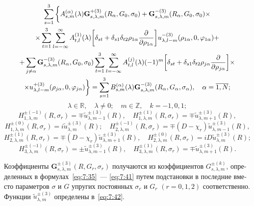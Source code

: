 \begin{russian}
\begin{multline}
\sum\limits_{s = 1}^3 \bigg\{  A_{s,m}^{(\alpha )}(\lambda ){\bf{G}}_{s,\lambda ,m}^{ + (3)}({R_\alpha },{G_0},{\sigma _0}) + {\bf{G}}_{s,\lambda ,m}^{ - (3)}({R_\alpha },{G_0},{\sigma _0}) \times \\
\times \sum\limits_{t = 1}^3 {\sum\limits_{l =  - \infty }^\infty  {A_{t,l}^{(1)}} } (\lambda )\bigg[{\delta _{st}} + {\delta _{s1}}{\delta _{t2}}{\rho _{1\alpha }}\frac{\partial }{{\partial {\rho _{1\alpha }}}}\bigg]u_{\lambda ,l - m}^{ - (3)}({\rho _{1\alpha }},0,{\varphi _{1\alpha }}) + \\
+ \sum\limits_{j \ne \alpha } {{\bf{G}}_{s,\lambda ,m}^{ - (3)}} ({R_\alpha },{G_0},{\sigma _0})\sum\limits_{t = 1}^3 {\sum\limits_{l =  - \infty }^\infty  {A_{t,l}^{(j)}} } (\lambda ){( - 1)^m}\bigg[{\delta _{st}} + {\delta _{s1}}{\delta _{t2}}{\rho _{j\alpha }}\frac{\partial }{{\partial {\rho _{j\alpha }}}}\bigg] \times \\
\times u_{\lambda ,l - m}^{ + (3)}({\rho _{j\alpha }},0,{\varphi _{j\alpha }})\bigg\}  = \sum\limits_{s = 1}^3 {B_{s,m}^{(\alpha )}} (\lambda ){\bf{G}}_{s,\lambda ,m}^{ - (3)}({R_\alpha },{G_\alpha },{\sigma _\alpha }),\;\;\;{\mkern 1mu} {\kern 1pt} \alpha  = \overline {1,N}; 
\end{multline}
$$
\lambda\in\mathbb{R},\quad\lambda\neq 0;\quad m\in\mathbb{Z},\quad k=-1,0,1;
$$
$$
H_{1,\lambda ,m}^{ \pm ( - 1)}(R,{\sigma _r}) =  \mp \tilde u_{\lambda ,m - 1}^{ \pm (3)}(R),\quad H_{1,\lambda ,m}^{ \pm (1)}(R,{\sigma _r}) =  \mp \tilde u_{\lambda ,m + 1}^{ \pm (3)}(R),
$$
$$
H_{1,\lambda ,m}^{ \pm (0)}(R,{\sigma _r}) = i\tilde u_{\lambda ,m}^{ \pm (3)}(R);\quad H_{2,\lambda ,m}^{ \pm ( - 1)}(R,{\sigma _r}) =  \mp \left( {D - {\chi _r}} \right)\tilde u_{\lambda ,m - 1}^{ \pm (3)}(R),
$$
$$
H_{2,\lambda ,m}^{ \pm (1)}(R,{\sigma _r}) =  \mp \left( {D - {\chi _r}} \right)\tilde u_{\lambda ,m + 1}^{ \pm (3)}(R),\quad H_{2,\lambda ,m}^{ \pm (0)}(R,{\sigma _r}) = iD\tilde u_{\lambda ,m}^{ \pm (3)}(R);
$$
$$
H_{3,\lambda ,m}^{ \pm ( - 1)}(R,{\sigma _r}) =  \pm \tilde u_{\lambda ,m - 1}^{ \pm (3)}(R),\quad H_{3,\lambda ,m}^{ \pm (1)}(R,{\sigma _r}) =  \mp \tilde u_{\lambda ,m + 1}^{ \pm (3)}(R).
$$

Коэффициенты $\mathbf{G}_{s,\lambda,m}^{\pm(3)}(R,G_r,\sigma_r)$ получаются из коэффициентов $G_{s,\lambda,m}^{\pm(k)}$, определенных в формулах~\eqref{eq:7:35}~--- \eqref{eq:7:41} путем подстановки в последние вместо параметров $\sigma$ и $G$ упругих постоянных $\sigma_r$ и $G_r$ $(r=0,1,2)$ соответственно. Функции $\tilde u_{\lambda,m}^{\pm(3)}$ определены в~\eqref{eq:7:42}.


\end{russian}
